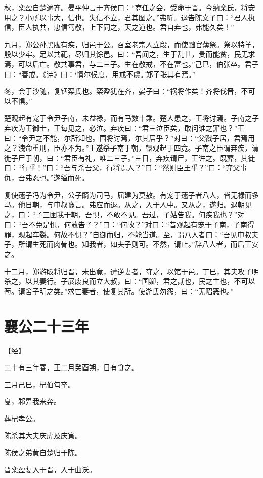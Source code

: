 \documentclass[a4paper,12pt,UTF8,twoside]{ctexbook}
\begin{document}
秋，栾盈自楚適齐。晏平仲言于齐侯曰：“商任之会，受命于晋。今纳栾氏，将安用之？小所以事大，信也。失信不立，君其图之。”弗听。退告陈文子曰：“君人执信，臣人执共，忠信笃敬，上下同之，天之道也。君自弃也，弗能久矣！”

九月，郑公孙黑肱有疾，归邑于公。召室老宗人立段，而使黜官薄祭。祭以特羊，殷以少牢。足以共祀，尽归其馀邑。曰：“吾闻之，生于乱世，贵而能贫，民无求焉，可以后亡。敬共事君，与二三子。生在敬戒，不在富也。”己巳，伯张卒。君子曰：“善戒。《诗》曰：‘慎尔侯度，用戒不虞。’郑子张其有焉。”

冬，会于沙随，复锢栾氏也。栾盈犹在齐，晏子曰：“祸将作矣！齐将伐晋，不可以不惧。”

楚观起有宠于令尹子南，未益禄，而有马数十乘。楚人患之，王将讨焉。子南之子弃疾为王御士，王每见之，必泣。弃疾曰：“君三泣臣矣，敢问谁之罪也？”王曰：“令尹之不能，尔所知也。国将讨焉，尔其居乎？”对曰：“父戮子居，君焉用之？洩命重刑，臣亦不为。”王遂杀子南于朝，轘观起于四竟。子南之臣谓弃疾，请徙子尸于朝，曰：“君臣有礼，唯二三子。”三日，弃疾请尸，王许之。既葬，其徒曰：“行乎！”曰：“吾与杀吾父，行将焉入？”曰：“然则臣王乎？”曰：“弃父事仇，吾弗忍也。”遂缢而死。

复使薳子冯为令尹，公子齮为司马，屈建为莫敖。有宠于薳子者八人，皆无禄而多马。他日朝，与申叔豫言。弗应而退。从之，入于人中。又从之，遂归。退朝见之，曰：“子三困我于朝，吾惧，不敢不见。吾过，子姑告我。何疾我也？”对曰：“吾不免是惧，何敢告子？”曰：“何故？”对曰：“昔观起有宠于子南，子南得罪，观起车裂。何故不惧？”自御而归，不能当道。至，谓八人者曰：“吾见申叔夫子，所谓生死而肉骨也。知我者，如夫子则可。不然，请止。”辞八人者，而后王安之。

十二月，郑游眅将归晋，未出竟，遭逆妻者，夺之，以馆于邑。丁巳，其夫攻子明杀之，以其妻行。子展废良而立大叔，曰：“国卿，君之贰也，民之主也，不可以苟。请舍子明之类。”求亡妻者，使复其所。使游氏勿怨，曰：“无昭恶也。”

\chapter{襄公二十三年}



【经】

二十有三年春，王二月癸酉朔，日有食之。

三月己巳，杞伯匄卒。

夏，邾畀我来奔。

葬杞孝公。

陈杀其大夫庆虎及庆寅。

陈侯之弟黄自楚归于陈。

晋栾盈复入于晋，入于曲沃。
\end{document}
